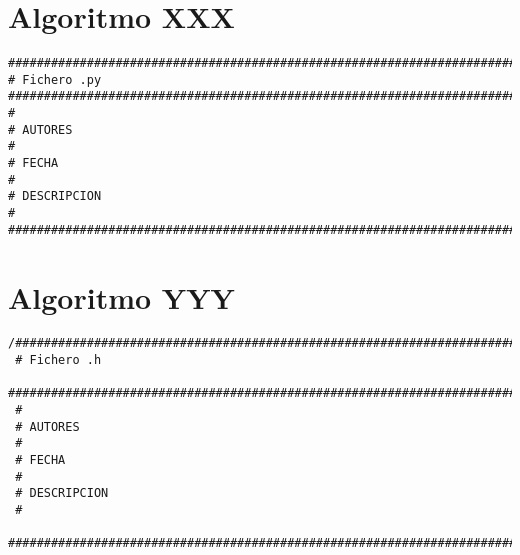 \section{Algoritmo XXX}
\label{Apendice1:XXX}

\begin{center}
\begin{footnotesize}
\begin{verbatim}
###################################################################################
# Fichero .py
###################################################################################
#
# AUTORES
#   
# FECHA
#
# DESCRIPCION
#
###################################################################################
\end{verbatim}
\end{footnotesize}
\end{center}

\section{Algoritmo YYY}
\label{Apendice1:YYY}

\begin{center}
\begin{footnotesize}
\begin{verbatim}
/###################################################################################
 # Fichero .h
 ###################################################################################
 #
 # AUTORES
 #
 # FECHA
 #
 # DESCRIPCION
 #
 ##################################################################################
\end{verbatim}
\end{footnotesize}
\end{center}

      
